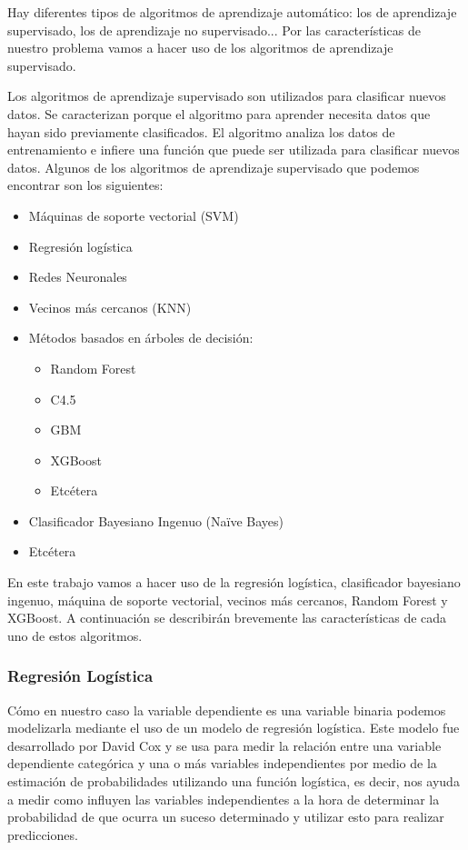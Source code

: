 \documentclass[11pt,a4paper,spanish]{article} %
\begin{document}
Hay diferentes tipos de algoritmos de aprendizaje automático: los de aprendizaje supervisado, los de aprendizaje no supervisado... Por las características de nuestro problema vamos a hacer uso de los algoritmos de aprendizaje supervisado. 

Los algoritmos de aprendizaje supervisado son utilizados para clasificar nuevos datos. Se caracterizan porque el algoritmo para aprender necesita datos que hayan sido previamente clasificados.  El algoritmo analiza los datos de entrenamiento e infiere una función que puede ser utilizada para clasificar nuevos datos. Algunos de los algoritmos de aprendizaje supervisado que podemos encontrar son los siguientes: 

\begin{itemize}

	\item{Máquinas de soporte vectorial (SVM)}
	\item{Regresión logística}
	\item{Redes Neuronales}
	\item{Vecinos más cercanos (KNN)}
	\item{Métodos basados en árboles de decisión:}
	
		\begin{itemize}
			\item{Random Forest}
			\item{C4.5}
			\item{GBM}
			\item{XGBoost}
			\item{Etcétera}
		\end{itemize}
		
	\item{Clasificador Bayesiano Ingenuo (Naïve Bayes)}
	\item{Etcétera}

\end{itemize}

En este trabajo vamos a hacer uso de la regresión logística, clasificador bayesiano ingenuo, máquina de soporte vectorial, vecinos más cercanos, Random Forest y XGBoost. A continuación se describirán brevemente las características de cada uno de estos algoritmos. 

\subsubsection{Regresión Logística}
Cómo en nuestro caso la variable dependiente es una variable binaria podemos modelizarla mediante el uso de un modelo de regresión logística. Este modelo fue desarrollado por David Cox y se usa para medir la relación entre una variable dependiente categórica y una o más variables independientes por medio de la estimación de probabilidades utilizando una función logística, es decir, nos ayuda a medir como influyen las variables independientes a la hora de determinar la probabilidad de que ocurra un suceso determinado y utilizar esto para realizar predicciones. 
\end{document}
